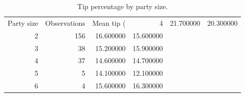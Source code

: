 \begin{table}
\caption{Tip percentage by party size.}
\label{tab:tips-party-size}
\begin{tabular}{rrrr}
\toprule
Party size & Observations & Mean tip (%
 & 4 & 21.700000 & 20.300000 \\
2 & 156 & 16.600000 & 15.600000 \\
3 & 38 & 15.200000 & 15.900000 \\
4 & 37 & 14.600000 & 14.700000 \\
5 & 5 & 14.100000 & 12.100000 \\
6 & 4 & 15.600000 & 16.300000 \\
\bottomrule
\end{tabular}
\end{table}

